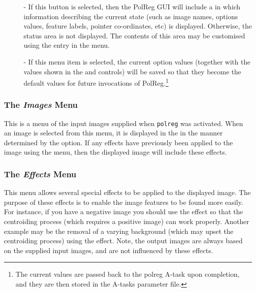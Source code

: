 \begin{description}
\item [] - 
If this button is selected, then the PolReg GUI will include a
 in which information
describing the current state (such as image names, options values, 
feature labels, pointer co-ordinates, etc) is displayed. Otherwise, the
status area is not displayed. The contents of this area may be customised
using the  entry in the
 menu.

\item [] - 
If this menu item is selected, the current option values (together with
the values shown in the 
and  controls) will be saved so that
they become the default values for future invocations of
PolReg.\footnote{The current values are passed back to the polreg A-task 
upon completion, and they are then stored in the A-tasks parameter file.}

\end{description} 

\subsubsection {The {\em Images} Menu}
This is a menu of the input images supplied when {\tt polreg} was
activated. When an image is selected from this menu, it is displayed in
the  in the manner
determined by the  option. If any
effects have previously been applied to the image using the  menu, then the displayed image will
include these effects.

\subsubsection {The {\em Effects} Menu}
This menu allows several special effects to be applied to the displayed
image. The purpose of these effects is to enable the image features to be
found more easily. For instance, if you have a negative image you should
use the  effect so that the
centroiding process (which requires a positive image) can work properly.
Another example may be the removal of a varying background (which may upset
the centroiding process) using the
 effect. Note, the output
images are always based on the supplied input images, and are not
influenced by these effects.

